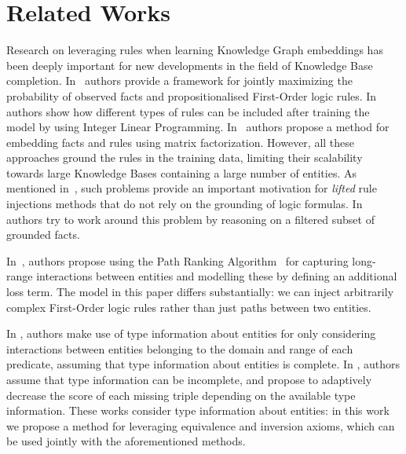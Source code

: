 
\section{Related Works} \label{sec:related}

%
Research on leveraging rules when learning Knowledge Graph embeddings has been deeply important for new developments in the field of Knowledge Base completion.
%
In~\cite{rocktaschel14low,DBLP:conf/naacl/RocktaschelSR15} authors provide a framework for jointly maximizing the probability of observed facts and propositionalised First-Order logic rules.
%
In~\cite{DBLP:conf/ijcai/WangWG15} authors show how different types of rules can be included after training the model by using Integer Linear Programming.
%
In~\cite{DBLP:conf/ijcai/WangC16} authors propose a method for embedding facts and rules using matrix factorization.
%
However, all these approaches ground the rules in the training data, limiting their scalability towards large Knowledge Bases containing a large number of entities.
%
As mentioned in~\cite{DBLP:conf/emnlp/DemeesterRR16}, such problems provide an important motivation for \emph{lifted} rule injections methods that do not rely on the grounding of logic formulas.
%
In~\cite{DBLP:conf/cikm/Wei0LQST15} authors try to work around this problem by reasoning on a filtered subset of grounded facts.
%

%
In~\cite{DBLP:conf/aaai/WuSYLZZ15}, authors propose using the Path Ranking Algorithm~\cite{DBLP:conf/emnlp/LaoMC11} for capturing long-range interactions between entities and modelling these by defining an additional loss term.
%
The model in this paper differs substantially: we can inject arbitrarily complex First-Order logic rules rather than just paths between two entities.
%

%
In \cite{DBLP:conf/emnlp/ChangYYM14,DBLP:conf/dsaa/KrompassNT14,DBLP:conf/semweb/KrompassBT15}, authors make use of type information about entities for only considering interactions between entities belonging to the domain and range of each predicate, assuming that type information about entities is complete.
%
In \cite{sac16}, authors assume that type information can be incomplete, and propose to adaptively decrease the score of each missing triple depending on the available type information.
%
These works consider type information about entities: in this work we propose a method for leveraging equivalence and inversion axioms, which can be used jointly with the aforementioned methods.
%

